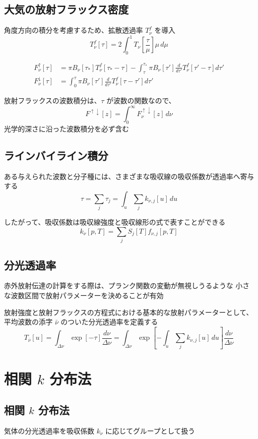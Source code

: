 \documentclass[article,nontitlepage,]{dennou777}
\begin{document}
\subsection{大気の放射フラックス密度}
角度方向の積分を考慮するため、拡散透過率 $T^f_\nu$ を導入
\[T^f_\nu[\tau]=2\int^1_0 T_\nu\left[\frac{\tau}{\mu}\right]\mu\,d\mu\]

\begin{align*}
	F^\uparrow_\nu[\tau]
		&=\pi B_\nu[\tau_*]T^f_\nu[\tau_*-\tau]
		-\int^{\tau_*}_\tau \pi B_\nu[\tau']\frac{d}{d\tau'}T^f_\nu[\tau'-\tau]d\tau'\\
	F^\downarrow_\nu[\tau]
		&=\int^\tau_0 \pi B_\nu[\tau']\frac{d}{d\tau'}T^f_\nu[\tau-\tau']d\tau'
\end{align*}

放射フラックスの波数積分は、$\tau$ が波数の関数なので、
\[F^{\uparrow\downarrow}[z]=\int^\infty_0 F^{\uparrow\downarrow}_\nu[z]\,d\nu\]
光学的深さに沿った波数積分を必ず含む

\subsection{ラインバイライン積分}
ある与えられた波数と分子種には、さまざまな吸収線の吸収係数が透過率へ寄与する
\[\tau=\sum_j \tau_j=\int_u\sum_j k_{\nu,j}[u]\,du\]

したがって、吸収係数は吸収線強度と吸収線形の式で表すことができる
\[k_\nu[p,T]=\sum_j S_j[T]f_{\nu,j}[p,T]\]

\subsection{分光透過率}
赤外放射伝達の計算をする際は、プランク関数の変動が無視しうるような
小さな波数区間で放射パラメーターを決めることが有効

放射強度と放射フラックスの方程式における基本的な放射パラメーターとして、
平均波数の添字 $\bar\nu$ のついた分光透過率を定義する
\[
	T_{\bar\nu}[u]
	=\int_{\Delta\nu}\exp[-\tau]\frac{d\nu}{\Delta\nu}
	=\int_{\Delta\nu}\exp\left[-\int_u\sum_j k_{\nu,j}[u]\,du\right]\frac{d\nu}{\Delta\nu}
\]

\section{相関 $k$ 分布法}

\subsection{相関 $k$ 分布法}
気体の分光透過率を吸収係数 $k_\nu$ に応じてグループとして扱う
\end{document}
